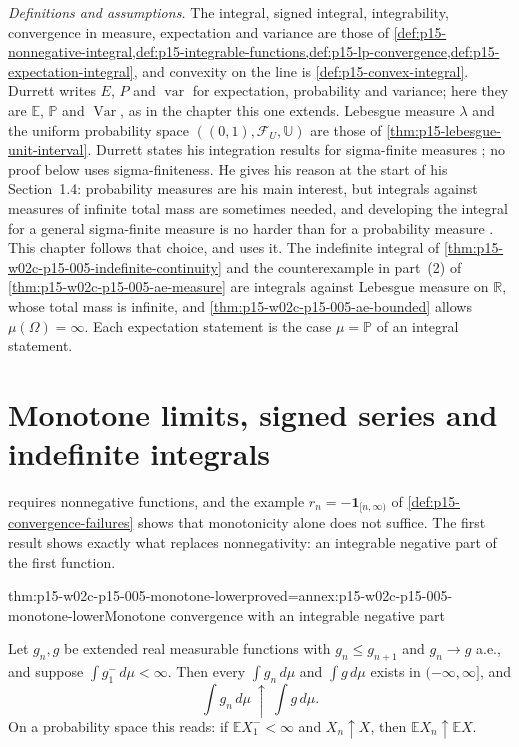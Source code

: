 \emph{Definitions and assumptions.} The integral, signed integral,
integrability, convergence in measure, expectation and variance are those
of \cref{def:p15-nonnegative-integral,def:p15-integrable-functions,def:p15-lp-convergence,def:p15-expectation-integral},
and convexity on the line is \cref{def:p15-convex-integral}. Durrett
writes \(E\), \(P\) and \(\operatorname{var}\) for expectation,
probability and variance; here they are \(\mathbb E\), \(\mathbb P\)
and \(\operatorname{Var}\), as in the chapter this one extends. Lebesgue
measure \(\lambda\) and the uniform probability space
\(((0,1),\mathcal F_U,\mathbb U)\) are those of
\cref{thm:p15-lebesgue-unit-interval}. Durrett states his integration
results for sigma-finite measures \cite[p.~18]{DurrettPTEAuthor2019};
no proof below uses sigma-finiteness. He gives his reason at the start
of his Section~1.4: probability measures are his main interest, but
integrals against measures of infinite total mass are sometimes needed,
and developing the integral for a general sigma-finite measure is no
harder than for a probability measure
\cite[sec.~1.4, p.~18]{DurrettPTEAuthor2019}. This chapter follows that
choice, and uses it. The indefinite integral of
\cref{thm:p15-w02c-p15-005-indefinite-continuity} and the counterexample
in part~(2) of \cref{thm:p15-w02c-p15-005-ae-measure} are integrals
against Lebesgue measure on \(\mathbb R\), whose total mass is infinite,
and \cref{thm:p15-w02c-p15-005-ae-bounded} allows
\(\mu(\Omega)=\infty\). Each expectation statement is the case
\(\mu=\mathbb P\) of an integral statement.

\section{Monotone limits, signed series and indefinite integrals}
\label{sec:p15-w02c-p15-005-limits-series}

 requires nonnegative functions, and
the example \(r_n=-\mathbf1_{[n,\infty)}\) of
\cref{def:p15-convergence-failures} shows that monotonicity alone does
not suffice. The first result shows exactly what replaces
nonnegativity: an integrable negative part of the first function.

\begin{hbtheorem}{thm:p15-w02c-p15-005-monotone-lower}{proved=annex:p15-w02c-p15-005-monotone-lower}{Monotone convergence with an integrable negative part}
\par\nobreak
Let \(g_n,g\) be extended real measurable functions with
\(g_n\leq g_{n+1}\) and \(g_n\to g\) a.e., and suppose
\(\int g_1^-\,d\mu<\infty\). Then every \(\int g_n\,d\mu\) and
\(\int g\,d\mu\) exists in \((-\infty,\infty]\), and
\[
 \int g_n\,d\mu\ \uparrow\ \int g\,d\mu .
\]
On a probability space this reads: if \(\mathbb EX_1^-<\infty\) and
\(X_n\uparrow X\), then \(\mathbb EX_n\uparrow\mathbb EX\).
\end{hbtheorem}

